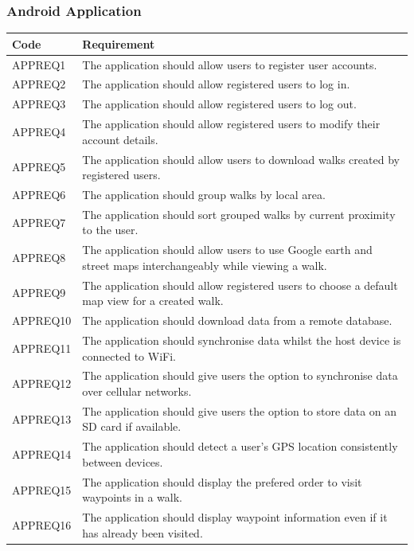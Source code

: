 \documentclass[11pt,a4paper]{article}
\begin{document}
\subsubsection{Android Application}

\begin{longtable}{|p{2.5cm}p{13cm}|}
\hline
\textbf{Code} & \textbf{Requirement} \\
\hline
APPREQ1 & The application should allow users to register user accounts. \\ \hline
APPREQ2 & The application should allow registered users to log in. \\ \hline
APPREQ3 & The application should allow registered users to log out. \\ \hline
APPREQ4 & The application should allow registered users to modify their account details. \\ \hline
APPREQ5 & The application should allow users to download walks created by registered users. \\ \hline
APPREQ6 & The application should group walks by local area. \\ \hline
APPREQ7 & The application should sort grouped walks by current proximity to the user. \\ \hline
APPREQ8 & The application should allow users to use Google earth and street maps interchangeably while viewing a walk. \\ \hline
APPREQ9 & The application should allow registered users to choose a default map view for a created walk. \\ \hline
APPREQ10 & The application should download data from a remote database. \\ \hline
APPREQ11 & The application should synchronise data whilst the host device is connected to WiFi. \\ \hline
APPREQ12 & The application should give users the option to synchronise data over cellular networks. \\ \hline
APPREQ13 & The application should give users the option to store data on an SD card if available. \\ \hline
APPREQ14 & The application should detect a user's GPS location consistently between devices. \\ \hline
APPREQ15 & The application should display the prefered order to visit waypoints in a walk. \\ \hline
APPREQ16 & The application should display waypoint information even if it has already been visited. \\ \hline

\end{longtable}
\end{document}
